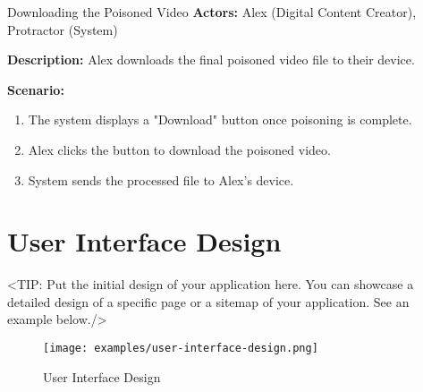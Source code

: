 \begin{usecase}{Downloading the Poisoned Video}
    \textbf{Actors:} Alex (Digital Content Creator), Protractor (System)

    \textbf{Description:} Alex downloads the final poisoned video file to their device.

    \textbf{Scenario:}
    \begin{enumerate}[leftmargin=80pt]
        \item The system displays a "Download" button once poisoning is complete.
        \item Alex clicks the button to download the poisoned video.
        \item System sends the processed file to Alex’s device.
    \end{enumerate}
\end{usecase}


\section{User Interface Design}
\label{section:user-interface-design}
<TIP: Put the initial design of your application here. You can
showcase a detailed design of a specific page or a sitemap of your application.
See an example below./>

\begin{figure}[h]
    \centering
    \texttt{[image: examples/user-interface-design.png]}
    \caption{User Interface Design}
\end{figure}